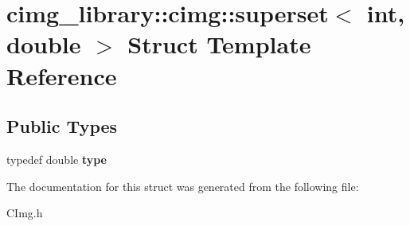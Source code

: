 \hypertarget{structcimg__library_1_1cimg_1_1superset_3_01int_00_01double_01_4}{\section{cimg\-\_\-library\-:\-:cimg\-:\-:superset$<$ int, double $>$ Struct Template Reference}
\label{structcimg__library_1_1cimg_1_1superset_3_01int_00_01double_01_4}
}
\subsection*{Public Types}
\begin{DoxyCompactItemize}
\item 
\hypertarget{structcimg__library_1_1cimg_1_1superset_3_01int_00_01double_01_4_a055d9246ba94b910ba645cd4dd644bd1}{typedef double {\bfseries type}}\label{structcimg__library_1_1cimg_1_1superset_3_01int_00_01double_01_4_a055d9246ba94b910ba645cd4dd644bd1}

\end{DoxyCompactItemize}


The documentation for this struct was generated from the following file\-:\begin{DoxyCompactItemize}
\item 
C\-Img.\-h\end{DoxyCompactItemize}
